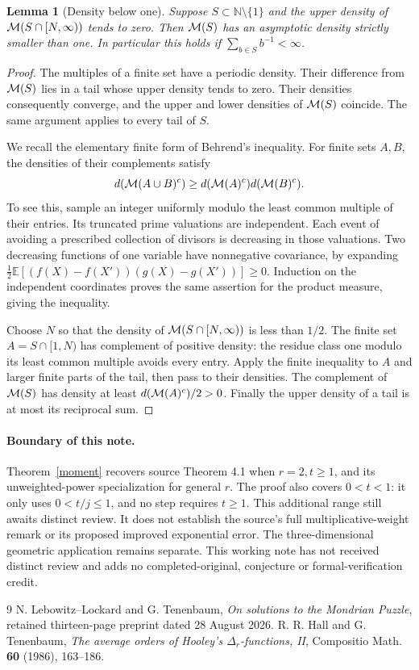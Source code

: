 \documentclass[11pt,a4paper]{article}
\newtheorem{lemma}[theorem]{Lemma}
\begin{document}
\begin{lemma}[Density below one]\label{multiples}
Suppose $S\subset\mathbb N\setminus\{1\}$ and the upper density of
${\cal M}(S\cap[N,\infty))$ tends to zero. Then ${\cal M}(S)$ has
an asymptotic density strictly smaller than one. In particular this
holds if $\sum_{b\in S}b^{-1}<\infty$.
\end{lemma}
\begin{proof}
The multiples of a finite set have a periodic density. Their difference
from ${\cal M}(S)$ lies in a tail whose upper density tends to zero.
Their densities consequently converge, and the upper and lower densities
of ${\cal M}(S)$ coincide. The same argument applies to every tail of $S$.

We recall the elementary finite form of Behrend's inequality. For finite
sets $A,B$, the densities of their complements satisfy
\[
 d({\cal M}(A\cup B)^c)\ge
 d({\cal M}(A)^c)d({\cal M}(B)^c).
\]
To see this, sample an integer uniformly modulo the least common multiple
of their entries. Its truncated prime valuations are independent. Each
event of avoiding a prescribed collection of divisors is decreasing in
those valuations. Two decreasing functions of one variable have
nonnegative covariance, by expanding
$\tfrac12\mathbb E[(f(X)-f(X'))(g(X)-g(X'))]\ge0$.
Induction on the independent coordinates proves the same assertion for
the product measure, giving the inequality.

Choose $N$ so that the density of ${\cal M}(S\cap[N,\infty))$ is
less than $1/2$. The finite set $A=S\cap[1,N)$ has complement of
positive density: the residue class one modulo its least common multiple
avoids every entry. Apply the finite inequality to $A$ and larger finite
parts of the tail, then pass to their densities. The complement of
${\cal M}(S)$ has density at least $d({\cal M}(A)^c)/2>0$.
Finally the upper density of a tail is at most its reciprocal sum.
\end{proof}

\paragraph{Boundary of this note.}
Theorem~\ref{moment} recovers source Theorem 4.1 when $r=2,t\ge1$, and its
unweighted-power specialization for general $r$. The proof also covers
$0<t<1$: it only uses $0<t/j\le1$, and no step requires $t\ge1$.
This additional range still awaits distinct review. It does not establish
the source's full multiplicative-weight remark or its proposed improved
exponential error. The three-dimensional geometric application remains
separate. This working note has not received distinct review and adds
no completed-original, conjecture or formal-verification credit.

\begin{thebibliography}{9}
 N. Lebowitz--Lockard and G. Tenenbaum,
\emph{On solutions to the Mondrian Puzzle}, retained thirteen-page
preprint dated 28 August 2026.
 R. R. Hall and G. Tenenbaum,
\emph{The average orders of Hooley's $\Delta_r$-functions, II},
Compositio Math. \textbf{60} (1986), 163--186.
\end{thebibliography}
\end{document}
